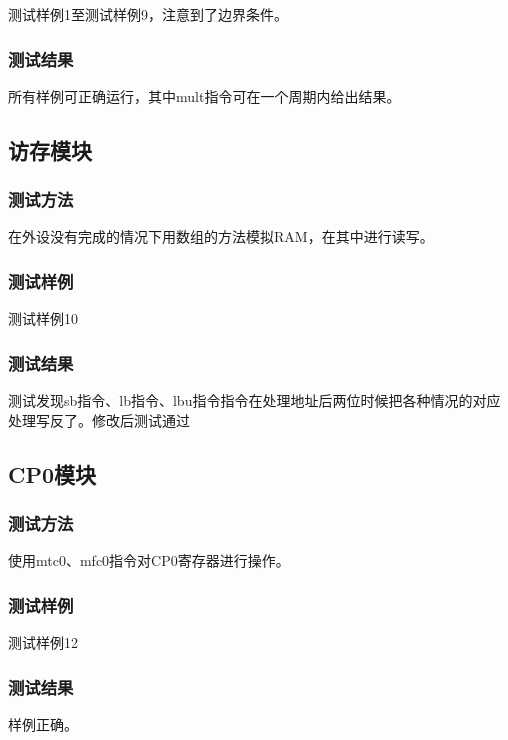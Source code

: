 测试样例1至测试样例9，注意到了边界条件。

\subsubsection{测试结果}

所有样例可正确运行，其中mult指令可在一个周期内给出结果。

\subsection{访存模块}
\subsubsection{测试方法}

在外设没有完成的情况下用数组的方法模拟RAM，在其中进行读写。

\subsubsection{测试样例}

测试样例10

\subsubsection{测试结果}

测试发现sb指令、lb指令、lbu指令指令在处理地址后两位时候把各种情况的对应处理写反了。修改后测试通过

\subsection{CP0模块}
\subsubsection{测试方法}

使用mtc0、mfc0指令对CP0寄存器进行操作。

\subsubsection{测试样例}

测试样例12

\subsubsection{测试结果}

样例正确。


